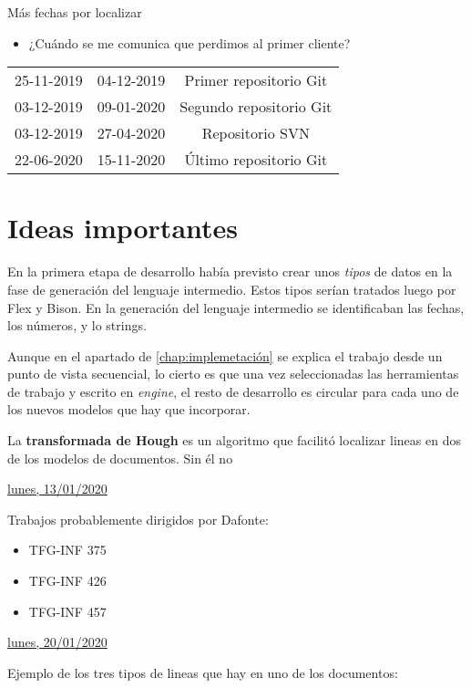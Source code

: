 Más fechas por localizar
\begin{itemize}
    \item ¿Cuándo se me comunica que perdimos al primer cliente?
\end{itemize}

\begin{center}
    \begin{tabular}{c|c|c}
     25-11-2019 & 04-12-2019 & Primer repositorio Git \\
     03-12-2019 & 09-01-2020 & Segundo repositorio Git \\
     03-12-2019 & 27-04-2020 & Repositorio SVN \\
     22-06-2020 & 15-11-2020 & Último repositorio Git
    \end{tabular}
\end{center}

\section{Ideas importantes}

En la primera etapa de desarrollo había previsto crear unos \emph{tipos} de datos en la fase de generación del lenguaje intermedio. Estos tipos serían tratados luego por Flex y Bison. En la generación del lenguaje intermedio se identificaban las fechas, los números, y lo strings.

Aunque en el apartado de \ref{chap:implemetación} se explica el trabajo desde un punto de vista secuencial, lo cierto es que una vez seleccionadas las herramientas de trabajo y escrito en \emph{engine}, el resto de desarrollo es circular para cada uno de los nuevos modelos que hay que incorporar.

La \textbf{transformada de Hough} es un algoritmo que facilitó localizar lineas en dos de los modelos de documentos. Sin él no 

\underline{lunes, 13/01/2020}

Trabajos probablemente dirigidos por Dafonte:

\begin{itemize}
    \item TFG-INF 375
    \item TFG-INF 426
    \item TFG-INF 457
\end{itemize}

\underline{lunes, 20/01/2020}

Ejemplo de los tres tipos de lineas que hay en uno de los documentos:

